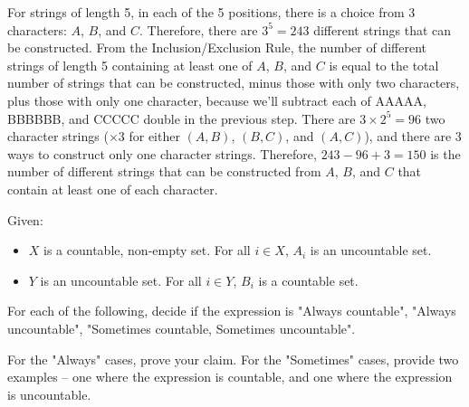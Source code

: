 \documentclass[11pt]{article}
\begin{document}
\begin{solution}
    \begin{Parts}
        \Part For strings of length 5, in each of the 5 positions, there is a
        choice from 3 characters: $A$, $B$, and $C$. Therefore, there are $3^5
        = 243$ different strings that can be constructed. 
        \Part From the Inclusion/Exclusion Rule, the number of different strings
        of length 5 containing at least one of $A$, $B$, and $C$ is equal to the
        total number of strings that can be constructed, minus those with only 
        two characters, plus those with only one character, because we'll subtract
        each of AAAAA, BBBBBB, and CCCCC double in the previous step. There
        are $3 \times 2^5 = 96$ two character strings ($\times 3$ for either $(A, B)$,
        $(B, C)$, and $(A, C)$), and there are 3 ways to construct only one character 
        strings. Therefore, $243-96+3=150$ is the number of different strings that
        can be constructed from $A$, $B$, and $C$ that contain at least one of each
        character. 
    \end{Parts}
\end{solution}


Given:
\begin{itemize}
\item $X$ is a countable, non-empty set. For all $i \in X$, $A_i$ is an uncountable set.
\item $Y$ is an uncountable set. For all $i \in Y$, $B_i$ is a countable set.
\end{itemize}

For each of the following, decide if the expression is
"Always countable", "Always uncountable", "Sometimes countable,
Sometimes uncountable".

For the "Always" cases, prove your claim. For the "Sometimes" cases, provide
two examples -- one where the expression is countable, and one where
the expression is uncountable.
\end{document}
